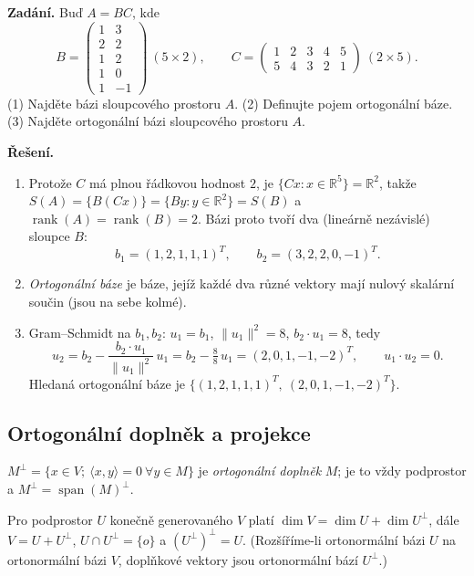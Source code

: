 \documentclass[11pt,a4paper]{article}
\newcommand{\rank}{\operatorname{rank}}
\newcommand{\spn}{\operatorname{span}}
\begin{document}
\begin{priklad} \par
\textbf{Zadání.}
Buď $A=BC$, kde
\[
  B=\begin{pmatrix}1&3\\2&2\\1&2\\1&0\\1&-1\end{pmatrix}\ (5\times2),\qquad
  C=\begin{pmatrix}1&2&3&4&5\\5&4&3&2&1\end{pmatrix}\ (2\times5).
\]
(1) Najděte bázi sloupcového prostoru $A$. (2) Definujte pojem ortogonální báze. (3) Najděte ortogonální bázi sloupcového prostoru $A$.

\textbf{Řešení.}
\begin{enumerate}[label=(\arabic*)]
  \item Protože $C$ má plnou řádkovou hodnost $2$, je $\{Cx:x\in\mathbb{R}^5\}=\mathbb{R}^2$, takže $S(A)=\{B(Cx)\}=\{By:y\in\mathbb{R}^2\}=S(B)$ a~$\rank(A)=\rank(B)=2$. Bázi proto tvoří dva (lineárně nezávislé) sloupce $B$:
    \[ b_1=(1,2,1,1,1)^T,\qquad b_2=(3,2,2,0,-1)^T. \]
  \item \emph{Ortogonální báze} je báze, jejíž každé dva různé vektory mají nulový skalární součin (jsou na sebe kolmé).
  \item Gram--Schmidt na $b_1,b_2$: $u_1=b_1$, $\|u_1\|^2=8$, $b_2\cdot u_1=8$, tedy
    \[ u_2=b_2-\frac{b_2\cdot u_1}{\|u_1\|^2}\,u_1=b_2-\tfrac88\,u_1=(2,0,1,-1,-2)^T,\qquad u_1\cdot u_2=0. \]
    Hledaná ortogonální báze je $\{(1,2,1,1,1)^T,\ (2,0,1,-1,-2)^T\}$.
\end{enumerate}
\end{priklad}

\subsection{Ortogonální doplněk a projekce}

\begin{definice}
$M^\perp=\{x\in V;\ \langle x,y\rangle=0\ \forall y\in M\}$ je \emph{ortogonální doplněk} $M$; je to vždy podprostor a $M^\perp=\spn(M)^\perp$.
\end{definice}

\begin{veta}
Pro podprostor $U$ konečně generovaného $V$ platí $\dim V=\dim U+\dim U^\perp$, dále $V=U+U^\perp$, $U\cap U^\perp=\{o\}$ a $(U^\perp)^\perp=U$. (Rozšíříme-li ortonormální bázi $U$ na ortonormální bázi $V$, doplňkové vektory jsou ortonormální bází $U^\perp$.)
\end{veta}
\end{document}
